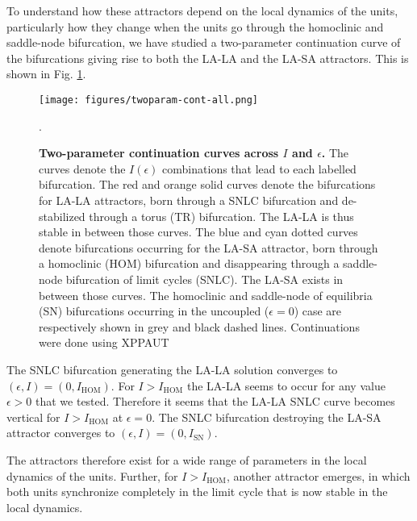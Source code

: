 To understand how these attractors depend on the local dynamics of the units, particularly how they change when the units go through the homoclinic and saddle-node bifurcation, we have studied a two-parameter continuation curve of the bifurcations giving rise to both the LA-LA and the LA-SA attractors. This is shown in Fig. \ref{fig:twoparam-continuation}.
\begin{figure}[h!]
    \centering
    \texttt{[image: figures/twoparam-cont-all.png]}
    \caption{\textbf{Two-parameter continuation curves across $I$ and $\epsilon$.} The curves denote the $I(\epsilon)$ combinations that lead to each labelled bifurcation. The red and orange solid curves denote the bifurcations for LA-LA attractors, born through a SNLC bifurcation and de-stabilized through a torus (TR) bifurcation. The LA-LA is thus stable in between those curves. The blue and cyan dotted curves denote bifurcations occurring for the LA-SA attractor, born through a homoclinic (HOM) bifurcation and disappearing through a saddle-node bifurcation of limit cycles (SNLC). The LA-SA exists in between those curves. The homoclinic and saddle-node of equilibria (SN) bifurcations occurring in the uncoupled ($\epsilon=0$) case are respectively shown in grey and black dashed lines.  Continuations were done using XPPAUT \cite{ermentrout2002simulating}}.
    \label{fig:twoparam-continuation}
\end{figure}


The SNLC bifurcation generating the LA-LA solution converges to $(\epsilon, I) = (0, I_\mathrm{HOM})$. For $I>I_\mathrm{HOM}$ the LA-LA seems to occur for any value $\epsilon > 0$ that we tested. Therefore it seems that the LA-LA SNLC curve becomes vertical for $I>I_\mathrm{HOM}$ at $\epsilon = 0$.
The SNLC bifurcation destroying the LA-SA attractor converges to $(\epsilon, I) = (0, I_\mathrm{SN})$.

The attractors therefore exist for a wide range of parameters in the local dynamics of the units. Further, for $I>I_\mathrm{HOM}$, another attractor emerges, in which both units synchronize completely in the limit cycle that is now stable in the local dynamics. 


